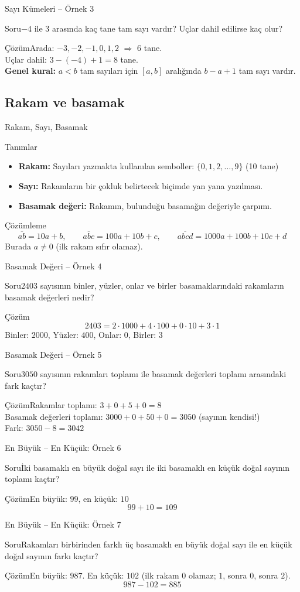 \documentclass[aspectratio=169,11pt,handout]{beamer}
\newcommand{\soru}[3]{%
\begin{frame}{#1}
  \begin{block}{Soru}\large #2\end{block}
  \pause
  \begin{exampleblock}{Çözüm}\large #3\end{exampleblock}
\end{frame}}
\newcommand{\ab}[1]{\overline{#1}}
\begin{document}
\soru{Sayı Kümeleri -- Örnek 3}
{\(-4\) ile \(3\) arasında kaç tane tam sayı vardır? Uçlar dahil edilirse kaç olur?}
{Arada: \(-3,-2,-1,0,1,2\) \(\Rightarrow\) \(6\) tane.\\[3pt]
Uçlar dahil: \(3-(-4)+1=8\) tane.\\[3pt]
\textbf{Genel kural:} \(a<b\) tam sayıları için \([a,b]\) aralığında \(b-a+1\) tam sayı vardır.}

\subsection{Rakam ve basamak}
\begin{frame}{Rakam, Sayı, Basamak}
\begin{block}{Tanımlar}
\begin{itemize}
\item \textbf{Rakam:} Sayıları yazmakta kullanılan semboller: \(\{0,1,2,\dots,9\}\) \quad (10 tane)
\item \textbf{Sayı:} Rakamların bir çokluk belirtecek biçimde yan yana yazılması.
\item \textbf{Basamak değeri:} Rakamın, bulunduğu basamağın değeriyle çarpımı.
\end{itemize}
\end{block}
\begin{block}{Çözümleme}
\[\ab{ab}=10a+b,\qquad \ab{abc}=100a+10b+c,\qquad \ab{abcd}=1000a+100b+10c+d\]
Burada \(a\neq 0\) (ilk rakam sıfır olamaz).
\end{block}
\end{frame}

\soru{Basamak Değeri -- Örnek 4}
{\(2403\) sayısının binler, yüzler, onlar ve birler basamaklarındaki rakamların basamak değerleri nedir?}
{\[2403=2\cdot 1000+4\cdot 100+0\cdot 10+3\cdot 1\]
Binler: \(2000\), \quad Yüzler: \(400\), \quad Onlar: \(0\), \quad Birler: \(3\)}

\soru{Basamak Değeri -- Örnek 5}
{\(3050\) sayısının rakamları toplamı ile basamak değerleri toplamı arasındaki fark kaçtır?}
{Rakamlar toplamı: \(3+0+5+0=8\)\\[3pt]
Basamak değerleri toplamı: \(3000+0+50+0=3050\) \quad (sayının kendisi!)\\[3pt]
Fark: \(3050-8=3042\)}

\soru{En Büyük -- En Küçük: Örnek 6}
{İki basamaklı en büyük doğal sayı ile iki basamaklı en küçük doğal sayının toplamı kaçtır?}
{En büyük: \(99\), \quad en küçük: \(10\)
\[99+10=109\]}

\soru{En Büyük -- En Küçük: Örnek 7}
{Rakamları birbirinden farklı üç basamaklı en büyük doğal sayı ile en küçük doğal sayının farkı kaçtır?}
{En büyük: \(987\). \quad En küçük: \(102\) \quad (ilk rakam \(0\) olamaz; \(1\), sonra \(0\), sonra \(2\)).
\[987-102=885\]}
\end{document}
